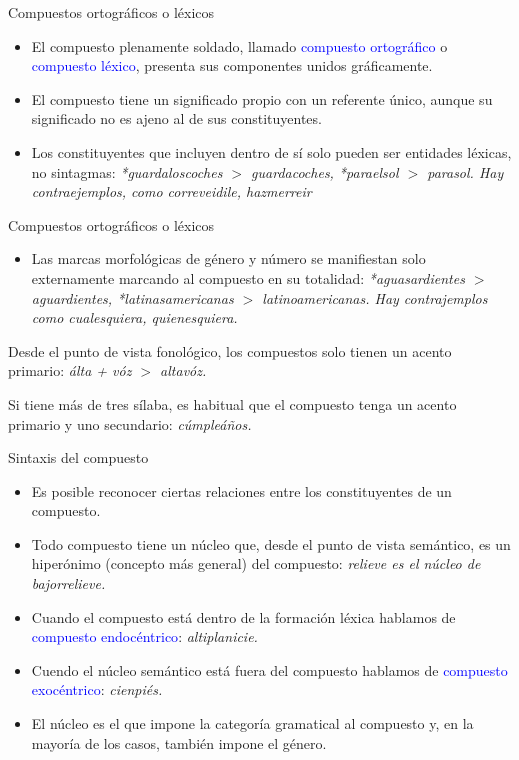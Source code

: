 \documentclass{beamer}
\begin{document}
\begin{frame}{Compuestos ortográficos o léxicos}

\begin{itemize}
	\item El compuesto plenamente soldado, llamado \textcolor{blue}{compuesto ortográfico} o \textcolor{blue}{compuesto léxico}, presenta sus componentes unidos gráficamente.
	\item El compuesto tiene un significado propio con un referente único, aunque su significado no es ajeno al de sus constituyentes.
	\item Los constituyentes que incluyen dentro de sí solo pueden ser entidades léxicas, no sintagmas: \it{*guardaloscoches $>$ guardacoches, *paraelsol $>$ parasol}. Hay contraejemplos, como \it{correveidile, hazmerreir} 
\end{itemize}

\end{frame}

\begin{frame}{Compuestos ortográficos o léxicos}

\begin{itemize}
	\item Las marcas morfológicas de género y número se manifiestan solo externamente marcando al compuesto en su totalidad: \it{*aguasardientes $>$ aguardientes, *latinasamericanas $>$ latinoamericanas}. Hay contrajemplos como \it{cualesquiera, quienesquiera}. 
\end{itemize}
    \item Desde el punto de vista fonológico, los compuestos solo tienen un acento primario: \it{álta} + \it{vóz} $>$ \it{altavóz}.
    \item Si tiene más de tres sílaba, es habitual que el compuesto tenga un acento primario y uno secundario: \it{cúmpleáños}.
\end{frame}

\begin{frame}{Sintaxis del compuesto}

\begin{itemize}
	\item Es posible reconocer ciertas relaciones entre los constituyentes de un compuesto. 
	\item Todo compuesto tiene un núcleo que, desde el punto de vista semántico, es un hiperónimo (concepto más general) del compuesto: \it{relieve} es el núcleo de \it{bajorrelieve}.
	\item Cuando el compuesto está dentro de la formación léxica hablamos de \textcolor{blue}{compuesto endocéntrico}: \it{altiplanicie}.
	\item Cuendo el núcleo semántico está fuera del compuesto hablamos de \textcolor{blue}{compuesto exocéntrico}: \it{cienpiés}.
	\item El núcleo es el que impone la categoría gramatical al compuesto y, en la mayoría de los casos, también impone el género.
\end{itemize}

\end{frame}
\end{document}
